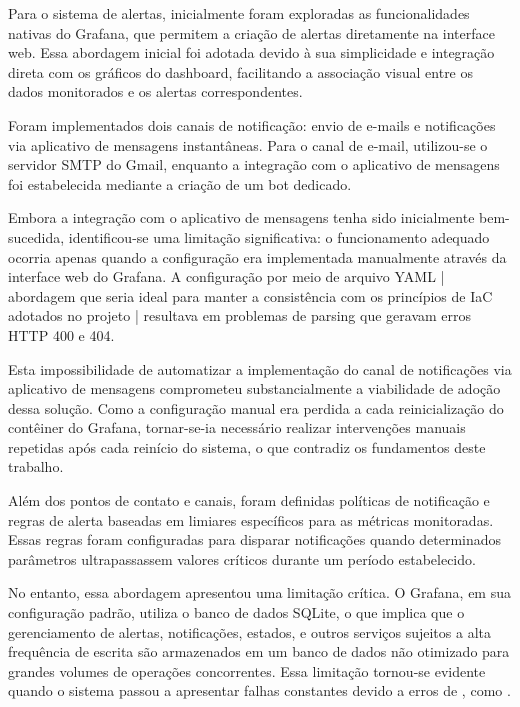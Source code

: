 Para o sistema de alertas, inicialmente foram exploradas as funcionalidades nativas do Grafana, que permitem a criação de alertas diretamente na interface web. Essa abordagem inicial foi adotada devido à sua simplicidade e integração direta com os gráficos do dashboard, facilitando a associação visual entre os dados monitorados e os alertas correspondentes.

{\color{red}
Foram implementados dois canais de notificação: envio de e-mails e notificações via aplicativo de mensagens instantâneas. Para o canal de e-mail, utilizou-se o servidor SMTP do Gmail, enquanto a integração com o aplicativo de mensagens foi estabelecida mediante a criação de um bot dedicado.

Embora a integração com o aplicativo de mensagens tenha sido inicialmente bem-sucedida, identificou-se uma limitação significativa: o funcionamento adequado ocorria apenas quando a configuração era implementada manualmente através da interface web do Grafana. A configuração por meio de arquivo YAML | abordagem que seria ideal para manter a consistência com os princípios de IaC adotados no projeto | resultava em problemas de parsing que geravam erros HTTP 400 e 404.

Esta impossibilidade de automatizar a implementação do canal de notificações via aplicativo de mensagens comprometeu substancialmente a viabilidade de adoção dessa solução. Como a configuração manual era perdida a cada reinicialização do contêiner do Grafana, tornar-se-ia necessário realizar intervenções manuais repetidas após cada reinício do sistema, o que contradiz os fundamentos deste trabalho.}

Além dos pontos de contato e canais, foram definidas políticas de notificação e regras de alerta baseadas em limiares específicos para as métricas monitoradas. Essas regras foram configuradas para disparar notificações quando determinados parâmetros ultrapassassem valores críticos durante um período estabelecido.

No entanto, essa abordagem apresentou uma limitação crítica. O Grafana, em sua configuração padrão, utiliza o banco de dados SQLite, o que implica que o gerenciamento de alertas, notificações, estados,  e outros serviços sujeitos a alta frequência de escrita são armazenados em um banco de dados não otimizado para grandes volumes de operações concorrentes. Essa limitação tornou-se evidente quando o sistema passou a apresentar falhas constantes devido a erros de , como .

